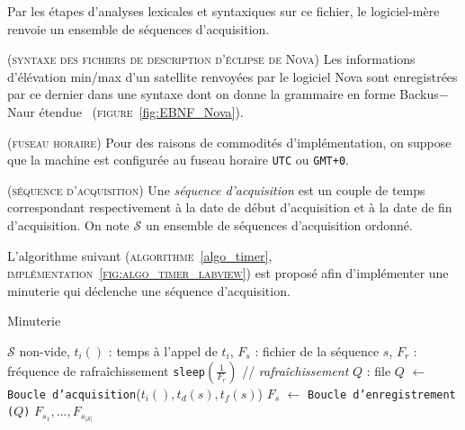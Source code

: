 \documentclass[twocolumn,pre,floats,aps,amsmath,amssymb]{revtex4}
\newenvironment{definition}[1][D\'efinition.]{\begin{trivlist}
\item[\hskip \labelsep {\bfseries #1}]}{\end{trivlist}}
\newenvironment{remark}[1][Remarque.]{\begin{trivlist}
\item[\hskip \labelsep {\bfseries #1}]}{\end{trivlist}}
\begin{document}
Par les \'etapes d'analyses lexicales et syntaxiques sur ce fichier, le logiciel-mère renvoie un ensemble de s\'equences d'acquisition.

\begin{remark}
  { \color{rltred}{\Radioactivity} }
  \textsc{(syntaxe des fichiers de description d'\'eclipse de Nova)}
  Les informations d'\'el\'evation min/max d'un satellite renvoy\'ees par le logiciel Nova sont enregistr\'ees par ce dernier dans une syntaxe dont on donne la grammaire en forme Backus$-$Naur \'etendue~\cite{EBNF} (\textsc{figure}~\ref{fig:EBNF_Nova}).
\end{remark}

\begin{remark}
  \textsc{(fuseau horaire)}
  Pour des raisons de commodit\'es d'impl\'ementation, on suppose que la machine est configur\'ee au fuseau horaire \texttt{UTC} ou \texttt{GMT+0}.
\end{remark}

\begin{definition}
  { \color{rltred}{\Radioactivity} }
  \textsc{(s\'equence d'acquisition)}
  Une \textit{s\'equence d'acquisition} est un couple de temps correspondant respectivement \`a la date de d\'ebut d'acquisition et \`a la date de fin d'acquisition. On note $\mathcal{S}$ un ensemble de s\'equences d'acquisition ordonn\'e.
\end{definition}

L'algorithme suivant (\textsc{algorithme}~\ref{algo_timer}, \textsc{impl\'ementation~\ref{fig:algo_timer_labview}}) est propos\'e afin d'impl\'ementer une minuterie qui d\'eclenche une s\'equence d'acquisition.

\begin{algorithm}[h]
\caption{Minuterie}
\label{algo_timer}
\begin{algorithmic}[1]
  \REQUIRE $\mathcal{S}$ non-vide, $t_i()$ : temps \`a l'appel de $t_i$, $F_s$ : fichier de la s\'equence $s$, $F_r$ : fr\'equence de rafra\^ichissement
  \STATE \texttt{sleep}$(\frac{1}{F_r})$ \hfill // \textit{rafra\^ichissement}
  \ENDWHILE
  \STATE $Q$ : file
  \STATE $Q$ $\leftarrow$ \texttt{Boucle d'acquisition}($t_i(), t_d (s), t_f (s)$)
  \STATE $F_s$ $\leftarrow$ \texttt{Boucle d'enregistrement ($Q$)}
  \ENDFOR
  \RETURN $F_{s_1}, \dots, F_{s_{\left | \mathcal{S} \right |}}$
\end{algorithmic}
\end{algorithm}
\end{document}
